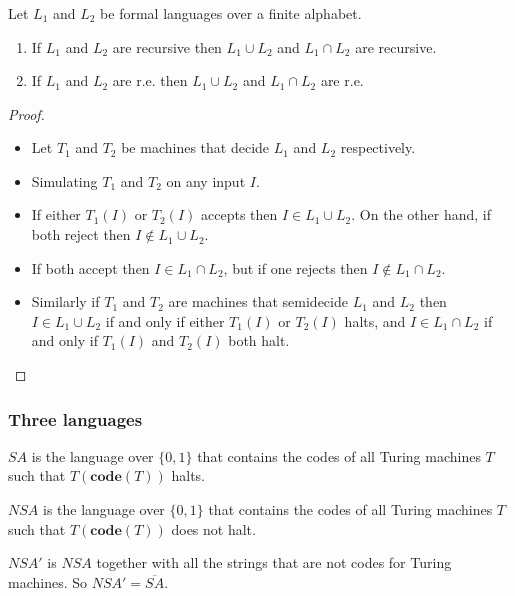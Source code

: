 \documentclass[handout]{beamer}
\newcommand{\co}{\mathbf{code}}
\begin{document}
\begin{frame}
\frametitle{}
\begin{theorem}
Let $L_1$ and $L_2$ be formal languages over a finite alphabet.
\begin{enumerate}
\item If $L_1$ and $L_2$ are recursive then $L_1\cup L_2$ and $L_1\cap L_2$ are recursive.
\item If $L_1$ and $L_2$ are r.e. then $L_1\cup L_2$ and $L_1\cap L_2$ are r.e.
\end{enumerate}
\end{theorem}
\begin{proof}
\begin{itemize}
\item Let $T_1$ and $T_2$ be machines that decide $L_1$ and $L_2$ respectively.
\item Simulating $T_1$ and $T_2$ on any input $I$. 
\item If either $T_1(I)$ or $T_2(I)$ accepts then $I\in L_1\cup L_2$. On the other hand, if both reject then $I\notin L_1\cup L_2$. 
\item If both accept then $I\in L_1\cap L_2$, but if one rejects then $I\notin L_1\cap L_2$.
\item Similarly if $T_1$ and $T_2$ are machines that semidecide $L_1$ and $L_2$ then $I\in L_1\cup L_2$ if and only if either $T_1(I)$ or $T_2(I)$ halts, and $I\in L_1\cap L_2$ if and only if $T_1(I)$ and $T_2(I)$ both halt. 
\end{itemize}
\end{proof}
\end{frame}

\begin{frame}
\frametitle{Three languages}
\begin{definition}
$SA$ is the language over $\{0,1\}$ that contains the codes of all Turing machines $T$ such that $T(\co(T))$ halts. 
\end{definition}
\vspace{0.4cm}
\begin{definition}
$NSA$ is the language over $\{0,1\}$ that contains the codes of all Turing machines $T$ such that $T(\co(T))$ does not halt.
\end{definition}
\vspace{0.4cm}
\begin{definition}[$NSA'$]
$NSA'$ is $NSA$ together with all the strings that are not codes for Turing machines. So $NSA'=\overline{SA}$.
\end{definition}
\end{frame}
\end{document}
